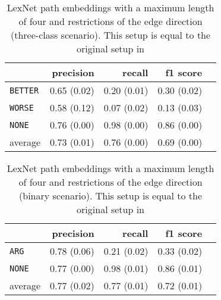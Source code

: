 	\begin{table}[h] 
		\centering 
		\caption{LexNet path embeddings with a maximum length of four and restrictions of the edge direction (three-class scenario). This setup is equal to the original setup in \cite{DBLP:journals/corr/ShwartzD16}} 
		\label{  }
		\begin{tabular}{@{}lrrrr@{}}
			\toprule
			        & precision                & recall                   & f1 score                 \\ \midrule 
			\texttt{BETTER}  & 0.65 \scriptsize{(0.02)} & 0.20 \scriptsize{(0.01)} & 0.30 \scriptsize{(0.02)} \\ 
			\texttt{WORSE}   & 0.58 \scriptsize{(0.12)} & 0.07 \scriptsize{(0.02)} & 0.13 \scriptsize{(0.03)} \\ 
			\texttt{NONE}    & 0.76 \scriptsize{(0.00)} & 0.98 \scriptsize{(0.00)} & 0.86 \scriptsize{(0.00)} \\ 
			average & 0.73 \scriptsize{(0.01)} & 0.76 \scriptsize{(0.00)} & 0.69 \scriptsize{(0.00)} \\ 
			\bottomrule
		\end{tabular}
	\end{table}
	
	\begin{table}[h] 
		\centering 
		\caption{LexNet path embeddings with a maximum length of four and restrictions of the edge direction (binary scenario). This setup is equal to the original setup in \cite{DBLP:journals/corr/ShwartzD16}} 
		\label{  }
		\begin{tabular}{@{}lrrrr@{}}
			\toprule
			        & precision                & recall                   & f1 score                 \\ \midrule 
			\texttt{ARG}     & 0.78 \scriptsize{(0.06)} & 0.21 \scriptsize{(0.02)} & 0.33 \scriptsize{(0.02)} \\ 
			\texttt{NONE}    & 0.77 \scriptsize{(0.00)} & 0.98 \scriptsize{(0.01)} & 0.86 \scriptsize{(0.01)} \\ 
			average & 0.77 \scriptsize{(0.02)} & 0.77 \scriptsize{(0.01)} & 0.72 \scriptsize{(0.01)} \\ 
			\bottomrule
		\end{tabular}
	\end{table}
	
